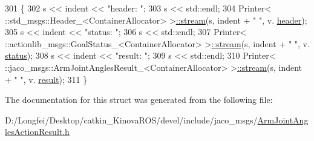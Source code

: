 \begin{DoxyCode}
301   \{
302     s << indent << \textcolor{stringliteral}{"header: "};
303     s << std::endl;
304     Printer< ::std\_msgs::Header\_<ContainerAllocator> >\hyperlink{structros_1_1message__operations_1_1Printer_3_01_1_1jaco__msgs_1_1ArmJointAnglesActionResult___3_01ContainerAllocator_01_4_01_4_a84ef1e26ad4c49c3b45441133f02b86a}{::stream}(s, indent + \textcolor{stringliteral}{"  "}, v.
      \hyperlink{structjaco__msgs_1_1ArmJointAnglesActionResult___a079944c74fedafa50405d3b8c9631a84}{header});
305     s << indent << \textcolor{stringliteral}{"status: "};
306     s << std::endl;
307     Printer< ::actionlib\_msgs::GoalStatus\_<ContainerAllocator> >\hyperlink{structros_1_1message__operations_1_1Printer_3_01_1_1jaco__msgs_1_1ArmJointAnglesActionResult___3_01ContainerAllocator_01_4_01_4_a84ef1e26ad4c49c3b45441133f02b86a}{::stream}(s, indent + \textcolor{stringliteral}{"  "}, v.
      \hyperlink{structjaco__msgs_1_1ArmJointAnglesActionResult___abcee28ae9e735f3212832991bce38b20}{status});
308     s << indent << \textcolor{stringliteral}{"result: "};
309     s << std::endl;
310     Printer< ::jaco\_msgs::ArmJointAnglesResult\_<ContainerAllocator> >\hyperlink{structros_1_1message__operations_1_1Printer_3_01_1_1jaco__msgs_1_1ArmJointAnglesActionResult___3_01ContainerAllocator_01_4_01_4_a84ef1e26ad4c49c3b45441133f02b86a}{::stream}(s, indent + \textcolor{stringliteral}{"  "}, v.
      \hyperlink{structjaco__msgs_1_1ArmJointAnglesActionResult___a7d2ea6532c4fe6e71f98b67a55df9d86}{result});
311   \}
\end{DoxyCode}


The documentation for this struct was generated from the following file\+:\begin{DoxyCompactItemize}
\item 
D\+:/\+Longfei/\+Desktop/catkin\+\_\+\+Kinova\+R\+O\+S/devel/include/jaco\+\_\+msgs/\hyperlink{ArmJointAnglesActionResult_8h}{Arm\+Joint\+Angles\+Action\+Result.\+h}\end{DoxyCompactItemize}
